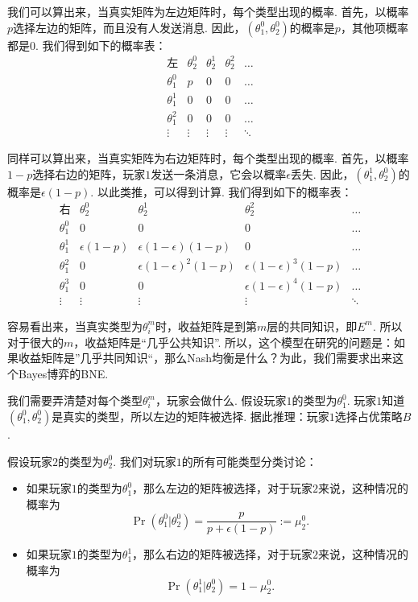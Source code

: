 我们可以算出来，当真实矩阵为左边矩阵时，每个类型出现的概率. 首先，以概率$p$选择左边的矩阵，而且没有人发送消息. 因此，$(\theta_1^0,\theta_2^0)$的概率是$p$，其他项概率都是$0$. 我们得到如下的概率表：
\[\begin{array}{c|cccc}
\text{左}& \theta_2^0 & \theta_2^1 & \theta_2^2 & \dots \\
\hline
\theta_1^0 & p & 0 & 0 & \dots \\
\theta_1^1 & 0 & 0 & 0 & \dots \\
\theta_1^2 & 0 & 0 & 0 & \dots \\
\vdots & \vdots & \vdots & \vdots & \ddots
\end{array}
\]

同样可以算出来，当真实矩阵为右边矩阵时，每个类型出现的概率. 首先，以概率$1 - p$选择右边的矩阵，玩家$1$发送一条消息，它会以概率$\epsilon$丢失. 因此，$(\theta_1^1,\theta_2^0)$的概率是$\epsilon(1 - p)$. 以此类推，可以得到计算. 我们得到如下的概率表：
\[
\begin{array}{c|cccc}
\text{右} & \theta_2^0 & \theta_2^1 & \theta_2^2 & \dots \\
\hline
\theta_1^0 & 0 & 0 & 0 & \dots \\
\theta_1^1 & \epsilon(1 - p) & \epsilon(1 - \epsilon)(1 - p) & 0 & \dots \\
\theta_1^2 & 0 & \epsilon(1 - \epsilon)^2(1 - p) & \epsilon(1 - \epsilon)^3(1 - p) & \dots \\
\theta_1^3 & 0 & 0 & \epsilon(1 - \epsilon)^4(1 - p) & \dots \\
\vdots & \vdots & \vdots & \vdots & \ddots
\end{array}
\]


容易看出来，当真实类型为$\theta_i^m$时，收益矩阵是到第$m$层的共同知识，即$E^m$. 所以对于很大的$m$，收益矩阵是“几乎公共知识”. 所以，这个模型在研究的问题是：如果收益矩阵是”几乎共同知识“，那么Nash均衡是什么？为此，我们需要求出来这个Bayes博弈的BNE.

我们需要弄清楚对每个类型$\theta_i^m$，玩家会做什么. 假设玩家$1$的类型为$\theta_1^0$. 玩家$1$知道$(\theta_1^0,\theta_2^0)$是真实的类型，所以左边的矩阵被选择. 据此推理：玩家$1$选择占优策略$B$.

假设玩家$2$的类型为$\theta_2^0$. 我们对玩家$1$的所有可能类型分类讨论：
\begin{itemize}
    \item 如果玩家$1$的类型为$\theta_1^0$，那么左边的矩阵被选择，对于玩家$2$来说，这种情况的概率为
    \[\Pr(\theta_1^0|\theta_2^0) = \frac{p}{p+\epsilon(1-p)} := \mu_2^0.\] 
    \item 如果玩家$1$的类型为$\theta_1^1$，那么右边的矩阵被选择，对于玩家$2$来说，这种情况的概率为
    \[\Pr(\theta_1^1|\theta_2^0) = 1 - \mu_2^0.\]
\end{itemize}


